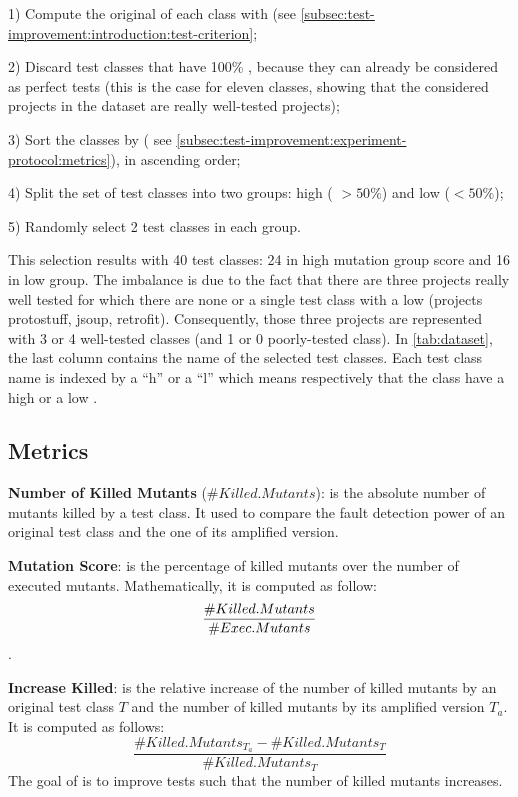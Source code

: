 1) Compute the original \ms of each class with \pitest (see \autoref{subsec:test-improvement:introduction:test-criterion};

2) Discard test classes that have 100\% \ms, because they can already be considered as perfect tests 
(this is the case for eleven classes, showing that the considered projects in the dataset are really well-tested projects);

3) Sort the classes by \ms ( see \autoref{subsec:test-improvement:experiment-protocol:metrics}), in ascending order;

4) Split the set of test classes into two groups: high \ms( $> 50\%$) and low \ms  ($< 50\%$);

5) Randomly select 2 test classes in each group.

This selection results with 40 test classes: 24 in high mutation group score and 16 in low \ms group.
The imbalance is due to the fact that there are three projects really well tested for which there are none or a single test class with a low \ms (projects protostuff, jsoup, retrofit).
Consequently, those three projects are represented with 3 or 4 well-tested classes (and 1 or 0 poorly-tested class). 
In \autoref{tab:dataset}, the last column contains the name of the selected test classes. 
Each test class name is indexed by a ``h'' or a ``l'' which means respectively that the class have a high \ms or a low \ms.

\subsection{Metrics}
\label{subsec:test-improvement:experiment-protocol:metrics}

\textbf{Number of Killed Mutants} ($\#Killed.Mutants$): is the absolute number of mutants killed by a test class. 
It used to compare the fault detection power of an original test class and the one of its amplified version.

\textbf{Mutation Score}: is the percentage of killed mutants over the number of executed mutants.
 Mathematically, it is computed as follow: $$\frac{\#Killed.Mutants}{\#Exec.Mutants} \time 100$$.

\textbf{Increase Killed}: is the relative increase of the number of killed mutants by an original test class $T$ and the number of killed mutants by its amplified version $T_a$.
It is computed as follows:
$$\frac{\#Killed.Mutants_{T_a} - \#Killed.Mutants_T}{\#Killed.Mutants_T}$$
The goal of \dspot is to improve tests such that the number of killed mutants increases.

